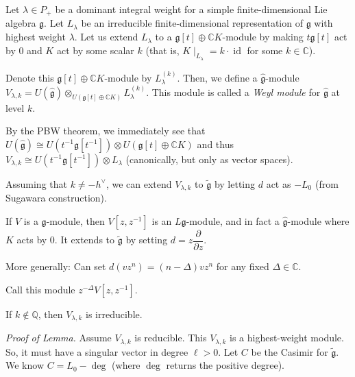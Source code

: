 \documentclass[etingof-lie.tex]{subfiles}
\begin{document}
\begin{definition}
Let $\lambda\in P_{+}$ be a dominant integral weight for a simple
finite-dimensional Lie algebra $\mathfrak{g}$. Let $L_{\lambda}$ be an
irreducible finite-dimensional representation of $\mathfrak{g}$ with highest
weight $\lambda$. Let us extend $L_{\lambda}$ to a $\mathfrak{g}\left[
t\right]  \oplus\mathbb{C}K$-module by making $t\mathfrak{g}\left[  t\right]
$ act by $0$ and $K$ act by some scalar $k$ (that is, $K\mid_{L_{\lambda}%
}=k\cdot\operatorname*{id}$ for some $k\in\mathbb{C}$).

Denote this $\mathfrak{g}\left[  t\right]  \oplus\mathbb{C}K$-module by
$L_{\lambda}^{\left(  k\right)  }$. Then, we define a $\widehat{\mathfrak{g}}%
$-module $V_{\lambda,k}=U\left(  \widehat{\mathfrak{g}}\right)  \otimes
_{U\left(  \mathfrak{g}\left[  t\right]  \oplus\mathbb{C}K\right)  }%
L_{\lambda}^{\left(  k\right)  }$. This module is called a \textit{Weyl
module} for $\widehat{\mathfrak{g}}$ at level $k$.
\end{definition}

By the PBW theorem, we immediately see that $U\left(  \widehat{\mathfrak{g}%
}\right)  \cong U\left(  t^{-1}\mathfrak{g}\left[  t^{-1}\right]  \right)
\otimes U\left(  \mathfrak{g}\left[  t\right]  \oplus\mathbb{C}K\right)  $ and
thus $V_{\lambda,k}\cong U\left(  t^{-1}\mathfrak{g}\left[  t^{-1}\right]
\right)  \otimes L_{\lambda}$ (canonically, but only as vector spaces).

Assuming that $k\neq-h^{\vee}$, we can extend $V_{\lambda,k}$ to
$\widetilde{\mathfrak{g}}$ by letting $d$ act as $-L_{0}$ (from Sugawara construction).

\begin{definition}
If $V$ is a $\mathfrak{g}$-module, then $V\left[  z,z^{-1}\right]  $ is an
$L\mathfrak{g}$-module, and in fact a $\widehat{\mathfrak{g}}$-module where
$K$ acts by $0$. It extends to $\widetilde{\mathfrak{g}}$ by setting
$d=z\dfrac{\partial}{\partial z}$.

More generally: Can set $d\left(  vz^{n}\right)  =\left(  n-\Delta\right)
vz^{n}$ for any fixed $\Delta\in\mathbb{C}$.

Call this module $z^{-\Delta}V\left[  z,z^{-1}\right]  $.
\end{definition}

\begin{lemma}
If $k\notin\mathbb{Q}$, then $V_{\lambda,k}$ is irreducible.
\end{lemma}

\textit{Proof of Lemma.} Assume $V_{\lambda,k}$ is reducible. This
$V_{\lambda,k}$ is a highest-weight module. So, it must have a singular vector
in degree $\ell>0$. Let $C$ be the Casimir for $\widetilde{\mathfrak{g}}$. We
know $C=L_{0}-\deg$ (where $\deg$ returns the positive degree).
\end{document}
